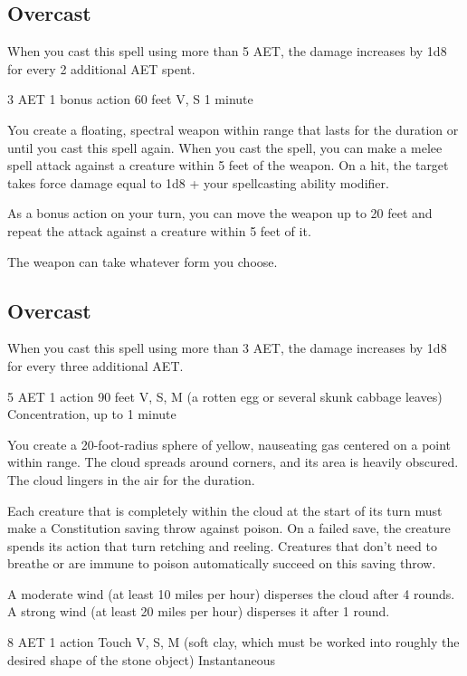 \subsection*{Overcast} When you cast this spell using more than 5 AET, the damage increases by 1d8 for every 2 additional AET spent.

{3 AET}
{1 bonus action}
{60 feet}
{V, S}
{1 minute}

You create a floating, spectral weapon within range that lasts for the duration or until you cast this spell again. When you cast the spell, you can make a melee spell attack against a creature within 5 feet of the weapon. On a hit, the target takes force damage equal to 1d8 + your spellcasting ability modifier.

As a bonus action on your turn, you can move the weapon up to 20 feet and repeat the attack against a creature within 5 feet of it.

The weapon can take whatever form you choose.

\subsection*{Overcast} When you cast this spell using more than 3 AET, the damage increases by 1d8 for every three additional AET.

{5 AET}
{1 action}
{90 feet}
{V, S, M (a rotten egg or several skunk cabbage leaves)}
{Concentration, up to 1 minute}

You create a 20-foot-radius sphere of yellow, nauseating gas centered on a point within range. The cloud spreads around corners, and its area is heavily obscured. The cloud lingers in the air for the duration.

Each creature that is completely within the cloud at the start of its turn must make a Constitution saving throw against poison. On a failed save, the creature spends its action that turn retching and reeling. Creatures that don't need to breathe or are immune to poison automatically succeed on this saving throw.

A moderate wind (at least 10 miles per hour) disperses the cloud after 4 rounds. A strong wind (at least 20 miles per hour) disperses it after 1 round.

{8 AET}
{1 action}
{Touch}
{V, S, M (soft clay, which must be worked into roughly the desired shape of the stone object)}
{Instantaneous}

